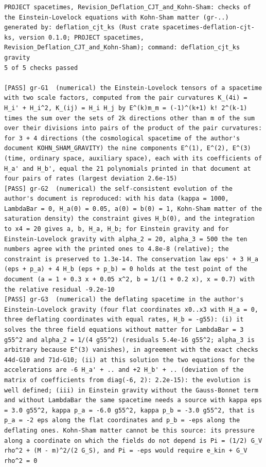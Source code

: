 \documentclass[
  10pt,
]{article}
\begin{document}
\begin{verbatim}
PROJECT spacetimes, Revision_Deflation_CJT_and_Kohn-Sham: checks of the Einstein-Lovelock equations with Kohn-Sham matter (gr-..)
generated by: deflation_cjt_ks (Rust crate spacetimes-deflation-cjt-ks, version 0.1.0; PROJECT spacetimes, Revision_Deflation_CJT_and_Kohn-Sham); command: deflation_cjt_ks gravity
5 of 5 checks passed

[PASS] gr-G1  (numerical) the Einstein-Lovelock tensors of a spacetime with two scale factors, computed from the pair curvatures K_(4i) = H_i' + H_i^2, K_(ij) = H_i H_j by E^(k)m_m = (-1)^(k+1) k! 2^(k-1) times the sum over the sets of 2k directions other than m of the sum over their divisions into pairs of the product of the pair curvatures: for 3 + 4 directions (the cosmological spacetime of the author's document KOHN_SHAM_GRAVITY) the nine components E^(1), E^(2), E^(3) (time, ordinary space, auxiliary space), each with its coefficients of H_a' and H_b', equal the 21 polynomials printed in that document at four pairs of rates (largest deviation 2.6e-15)
[PASS] gr-G2  (numerical) the self-consistent evolution of the author's document is reproduced: with his data (kappa = 1000, LambdaBar = 0, H_a(0) = 0.05, a(0) = b(0) = 1, Kohn-Sham matter of the saturation density) the constraint gives H_b(0), and the integration to x4 = 20 gives a, b, H_a, H_b; for Einstein gravity and for Einstein-Lovelock gravity with alpha_2 = 20, alpha_3 = 500 the ten numbers agree with the printed ones to 4.8e-8 (relative); the constraint is preserved to 1.3e-14. The conservation law eps' + 3 H_a (eps + p_a) + 4 H_b (eps + p_b) = 0 holds at the test point of the document (a = 1 + 0.3 x + 0.05 x^2, b = 1/(1 + 0.2 x), x = 0.7) with the relative residual -9.2e-10
[PASS] gr-G3  (numerical) the deflating spacetime in the author's Einstein-Lovelock gravity (four flat coordinates x0..x3 with H_a = 0, three deflating coordinates with equal rates, H_b = -g55): (i) it solves the three field equations without matter for LambdaBar = 3 g55^2 and alpha_2 = 1/(4 g55^2) (residuals 5.4e-16 g55^2; alpha_3 is arbitrary because E^(3) vanishes), in agreement with the exact checks 44d-G10 and 71d-G10; (ii) at this solution the two equations for the accelerations are -6 H_a' + .. and +2 H_b' + .. (deviation of the matrix of coefficients from diag(-6, 2): 2.2e-15): the evolution is well defined; (iii) in Einstein gravity without the Gauss-Bonnet term and without LambdaBar the same spacetime needs a source with kappa eps = 3.0 g55^2, kappa p_a = -6.0 g55^2, kappa p_b = -3.0 g55^2, that is p_a = -2 eps along the flat coordinates and p_b = -eps along the deflating ones. Kohn-Sham matter cannot be this source: its pressure along a coordinate on which the fields do not depend is Pi = (1/2) G_V rho^2 + (M - m)^2/(2 G_S), and Pi = -eps would require e_kin + G_V rho^2 = 0

\end{verbatim}
\end{document}
